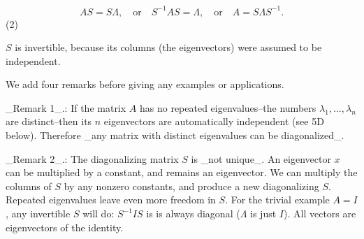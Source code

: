 \[AS=S\Lambda,\quad\text{or}\quad S^{-1}AS=\Lambda,\quad\text{or}\quad A=S \Lambda S^{-1}.\] (2)

\(S\) is invertible, because its columns (the eigenvectors) were assumed to be independent.

We add four remarks before giving any examples or applications. 

_Remark 1_.: If the matrix \(A\) has no repeated eigenvalues--the numbers \(\lambda_{1},\dots,\lambda_{n}\) are distinct--then its \(n\) eigenvectors are automatically independent (see 5D below). Therefore _any matrix with distinct eigenvalues can be diagonalized_.

_Remark 2_.: The diagonalizing matrix \(S\) is _not unique_. An eigenvector \(x\) can be multiplied by a constant, and remains an eigenvector. We can multiply the columns of \(S\) by any nonzero constants, and produce a new diagonalizing \(S\). Repeated eigenvalues leave even more freedom in \(S\). For the trivial example \(A=I\), any invertible \(S\) will do: \(S^{-1}IS\) is is always diagonal (\(\Lambda\) is just \(I\)). All vectors are eigenvectors of the identity.


